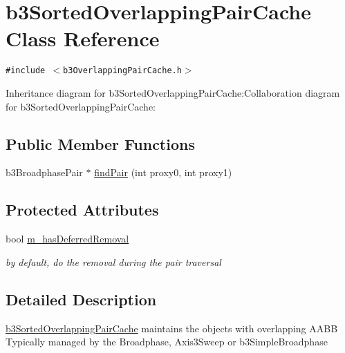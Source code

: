 \hypertarget{classb3_sorted_overlapping_pair_cache}{
\section{b3SortedOverlappingPairCache Class Reference}
\label{classb3_sorted_overlapping_pair_cache}
}
{\tt \#include $<$b3OverlappingPairCache.h$>$}

Inheritance diagram for b3SortedOverlappingPairCache:Collaboration diagram for b3SortedOverlappingPairCache:\subsection*{Public Member Functions}
\begin{CompactItemize}
\item 
b3BroadphasePair $\ast$ \hyperlink{classb3_sorted_overlapping_pair_cache_d24f6d5bfc4b9e378ace06bcb10519ea}{findPair} (int proxy0, int proxy1)
\end{CompactItemize}
\subsection*{Protected Attributes}
\begin{CompactItemize}
\item 
\hypertarget{classb3_sorted_overlapping_pair_cache_ebe6abcf2a675cda50246430a4e5cea4}{
bool \hyperlink{classb3_sorted_overlapping_pair_cache_ebe6abcf2a675cda50246430a4e5cea4}{m\_\-hasDeferredRemoval}}
\label{classb3_sorted_overlapping_pair_cache_ebe6abcf2a675cda50246430a4e5cea4}

\begin{CompactList}\small\item\em by default, do the removal during the pair traversal \item\end{CompactList}\end{CompactItemize}


\subsection{Detailed Description}
\hyperlink{classb3_sorted_overlapping_pair_cache}{b3SortedOverlappingPairCache} maintains the objects with overlapping AABB Typically managed by the Broadphase, Axis3Sweep or b3SimpleBroadphase 

